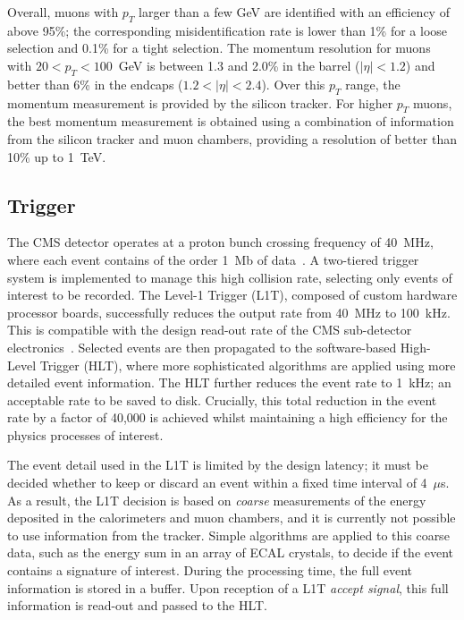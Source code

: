 Overall, muons with $p_T$ larger than a few GeV are identified with an efficiency of above 95\%; the corresponding misidentification rate is lower than 1\% for a loose selection and 0.1\% for a tight selection. The momentum resolution for muons with $20<p_T<100$~GeV is between 1.3 and 2.0\% in the barrel ($|\eta|<1.2$) and better than 6\% in the endcaps ($1.2<|\eta|<2.4$). Over this $p_T$ range, the momentum measurement is provided by the silicon tracker. For higher $p_T$ muons, the best momentum measurement is obtained using a combination of information from the silicon tracker and muon chambers, providing a resolution of better than 10\% up to 1~TeV.

\subsection{Trigger}\label{sec:trigger}
The CMS detector operates at a proton bunch crossing frequency of 40~MHz, where each event contains of the order 1~Mb of data~\cite{Khachatryan:2016bia}. A two-tiered trigger system is implemented to manage this high collision rate, selecting only events of interest to be recorded. The Level-1 Trigger (L1T), composed of custom hardware processor boards, successfully reduces the output rate from 40~MHz to 100~kHz. This is compatible with the design read-out rate of the CMS sub-detector electronics~\cite{Sphicas:2002gg}. Selected events are then propagated to the software-based High-Level Trigger (HLT), where more sophisticated algorithms are applied using more detailed event information. The HLT further reduces the event rate to 1~kHz; an acceptable rate to be saved to disk. Crucially, this total reduction in the event rate by a factor of 40,000 is achieved whilst maintaining a high efficiency for the physics processes of interest.

The event detail used in the L1T is limited by the design latency; it must be decided whether to keep or discard an event within a fixed time interval of 4~$\mu$s. As a result, the L1T decision is based on \textit{coarse} measurements of the energy deposited in the calorimeters and muon chambers, and it is currently not possible to use information from the tracker. Simple algorithms are applied to this coarse data, such as the energy sum in an array of ECAL crystals, to decide if the event contains a signature of interest. During the processing time, the full event information is stored in a buffer. Upon reception of a L1T \textit{accept signal}, this full information is read-out and passed to the HLT.

